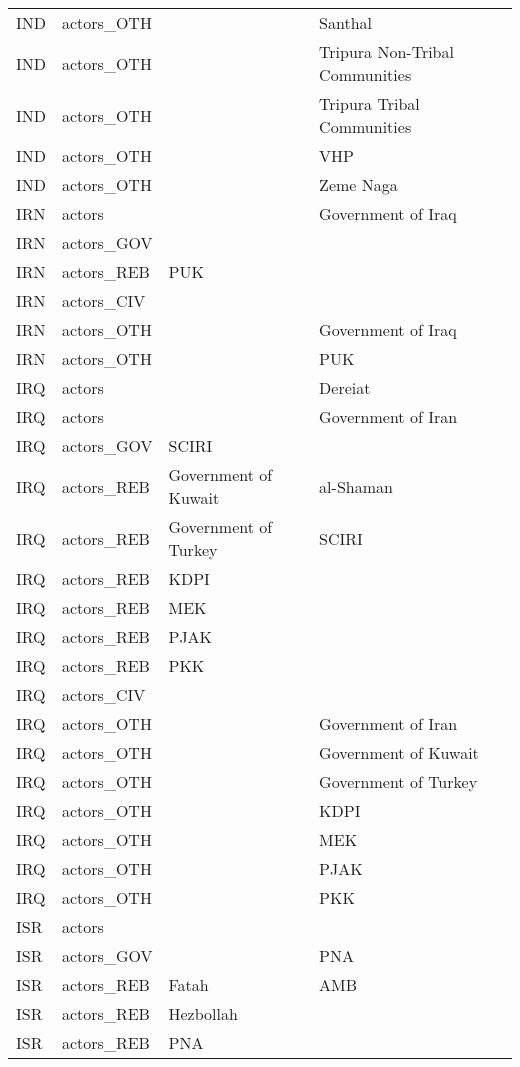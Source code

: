 \begin{table}[ht]
\begin{tabular}{llll}
  IND & actors\_OTH &  & Santhal \\ 
  IND & actors\_OTH &  & Tripura Non-Tribal Communities \\ 
  IND & actors\_OTH &  & Tripura Tribal Communities \\ 
  IND & actors\_OTH &  & VHP \\ 
  IND & actors\_OTH &  & Zeme Naga \\ 
  IRN & actors &  & Government of Iraq \\ 
  IRN & actors\_GOV &  &  \\ 
  IRN & actors\_REB & PUK &  \\ 
  IRN & actors\_CIV &  &  \\ 
  IRN & actors\_OTH &  & Government of Iraq \\ 
  IRN & actors\_OTH &  & PUK \\ 
  IRQ & actors &  & Dereiat \\ 
  IRQ & actors &  & Government of Iran \\ 
  IRQ & actors\_GOV & SCIRI &  \\ 
  IRQ & actors\_REB & Government of Kuwait & al-Shaman \\ 
  IRQ & actors\_REB & Government of Turkey & SCIRI \\ 
  IRQ & actors\_REB & KDPI &  \\ 
  IRQ & actors\_REB & MEK &  \\ 
  IRQ & actors\_REB & PJAK &  \\ 
  IRQ & actors\_REB & PKK &  \\ 
  IRQ & actors\_CIV &  &  \\ 
  IRQ & actors\_OTH &  & Government of Iran \\ 
  IRQ & actors\_OTH &  & Government of Kuwait \\ 
  IRQ & actors\_OTH &  & Government of Turkey \\ 
  IRQ & actors\_OTH &  & KDPI \\ 
  IRQ & actors\_OTH &  & MEK \\ 
  IRQ & actors\_OTH &  & PJAK \\ 
  IRQ & actors\_OTH &  & PKK \\ 
  ISR & actors &  &  \\ 
  ISR & actors\_GOV &  & PNA \\ 
  ISR & actors\_REB & Fatah & AMB \\ 
  ISR & actors\_REB & Hezbollah &  \\ 
  ISR & actors\_REB & PNA &  \\ 

\end{tabular}
\end{table}
